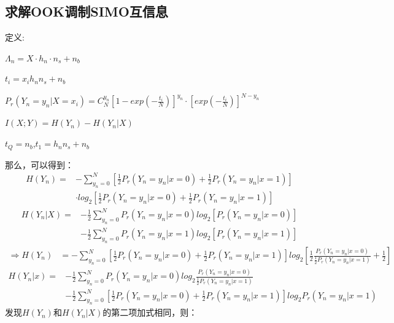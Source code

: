 \documentclass[12pt]{article}
\begin{document}
\subsection{求解OOK调制SIMO互信息}
定义:\par$\Lambda_n=X·h_n·n_s+n_b$\par$t_i=x_ih_nn_s+n_b$\par$P_r(Y_n=y_n|X=x_i)=C_N^{y_n}\left[1-exp\left(-\frac{t_i}{N}\right)\right]^{y_n}·\left[exp\left(-\frac{t_i}{N}\right)\right]^{N-y_n}$\par$I(X;Y)=H(Y_n)-H(Y_n|X)$\par$t_Q=n_b$,$t_1=h_nn_s+n_b$\par
那么，可以得到：
\begin{equation*}
    \begin{aligned}
      H(Y_n)=&-\sum\limits_{y_n=0}^N\left[\frac{1}{2}P_r(Y_n=y_n|x=0)+\frac{1}{2}P_r(Y_n=y_n|x=1)\right] \\
      &·log_2\left[\frac{1}{2}P_r(Y_n=y_n|x=0)+\frac{1}{2}P_r(Y_n=y_n|x=1)\right]
    \end{aligned}
\end{equation*}
\begin{equation*}
    \begin{aligned}
      H(Y_n|X)=&-\frac{1}{2}\sum\limits_{y_n=0}^NP_r(Y_n=y_n|x=0)log_2[P_r(Y_n=y_n|x=0)] \\
      &-\frac{1}{2}\sum\limits_{y_n=0}^NP_r(Y_n=y_n|x=1)log_2[P_r(Y_n=y_n|x=1)]
    \end{aligned}
\end{equation*}
\begin{equation*}
    \begin{aligned}
      \Rightarrow H(Y_n)&=-\sum\limits_{y_n=0}^N\left[\frac{1}{2}P_r(Y_n=y_n|x=0)+\frac{1}{2}P_r(Y_n=y_n|x=1)\right]log_2\left[\frac{1}{2}\frac{P_r(Y_n=y_n|x=0)}{\frac{1}{2}P_r(Y_n=y_n|x=1)}+\frac{1}{2}\right]
    \end{aligned}
\end{equation*}
\begin{equation*}
    \begin{aligned}
       H(Y_n|x)=&-\frac{1}{2}\sum\limits_{y_n=0}^NP_r(Y_n=y_n|x=0)log_2\frac{P_r(Y_n=y_n|x=0)}{\frac{1}{2}P_r(Y_n=y_n|x=1)}\\
       &-\frac{1}{2}\sum\limits_{y_n=0}^N\left[\frac{1}{2}P_r(Y_n=y_n|x=0)+\frac{1}{2}P_r(Y_n=y_n|x=1)\right]log_2P_r(Y_n=y_n|x=1)
    \end{aligned}
\end{equation*}
发现$H(Y_n)$和$H(Y_n|X)$的第二项加式相同，则：
\end{document}
